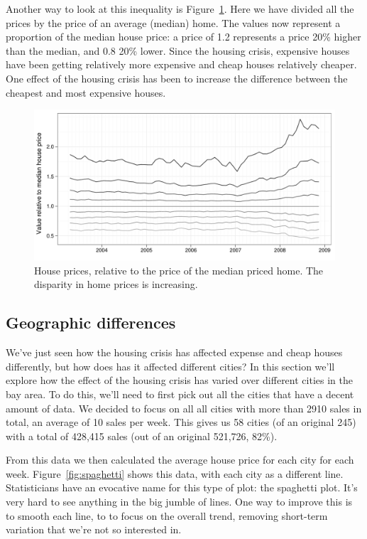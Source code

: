 \documentclass[oneside]{article}
\begin{document}
Another way to look at this inequality is Figure~\ref{fig:decile-rel}.  Here we have divided all the prices by the price of an average (median) home.  The values now represent a proportion of the median house price: a price of 1.2 represents a price 20\% higher than the median, and 0.8 20\% lower. Since the housing crisis, expensive houses have been getting relatively more expensive and cheap houses relatively cheaper.  One effect of the housing crisis has been to increase the difference between the cheapest and most expensive houses.

\begin{figure}[htbp]
  \centering
  \includegraphics[width=0.75\linewidth]{decile-rel}
  \caption{House prices, relative to the price of the median priced home.  The disparity in home prices is increasing.}
  \label{fig:decile-rel}
\end{figure}

\subsection{Geographic differences}

We've just seen how the housing crisis has affected expense and cheap houses differently, but how does has it affected different cities?  In this section we'll explore how the effect of the housing crisis has varied over different cities in the bay area.  To do this, we'll need to first pick out all the cities that have a decent amount of data.  We decided to focus on all all cities with more than 2910 sales in total, an average of 10 sales per week.  This gives us 58 cities (of an original 245) with a total of 428,415 sales (out of an original 521,726, 82\%).  

From this data we then calculated the average house price for each city for each week.  Figure~\ref{fig:spaghetti} shows this data, with each city as a different line.  Statisticians have an evocative name for this type of plot: the spaghetti plot.  It's very hard to see anything in the big jumble of lines.  One way to improve this is to smooth each line, to to focus on the overall trend, removing short-term variation that we're not so interested in. 
\end{document}
